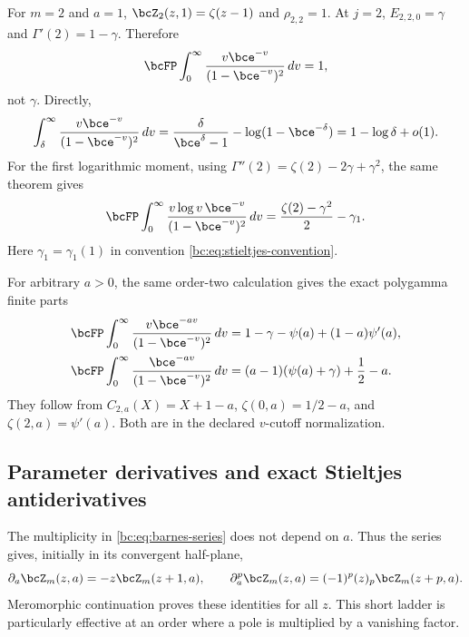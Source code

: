 \begin{example}
For $m=2$ and $a=1$,
$\bcZ_2(z,1)=\zeta(z-1)$ and $\rho_{2,2}=1$. At $j=2$,
$E_{2,2,0}=\gamma$ and $\Gamma'(2)=1-\gamma$. Therefore
\begin{equation}\label{bc:eq:Mellin-test-zero}
 \bcFP\int_0^\infty
           \frac{v\bce^{-v}}{(1-\bce^{-v})^2}\,dv=1,
\end{equation}
not $\gamma$. Directly,
\[
 \int_\delta^\infty\frac{v\bce^{-v}}{(1-\bce^{-v})^2}\,dv
  =\frac{\delta}{\bce^\delta-1}-\log(1-\bce^{-\delta})
  =1-\log\delta+o(1).
\]
For the first logarithmic moment, using
$\Gamma''(2)=\zeta(2)-2\gamma+\gamma^2$, the same theorem gives
\begin{equation}\label{bc:eq:Mellin-test-one}
 \bcFP\int_0^\infty
         \frac{v\log v\,\bce^{-v}}{(1-\bce^{-v})^2}\,dv
       =\frac{\zeta(2)-\gamma^2}{2}-\gamma_1.
\end{equation}
Here $\gamma_1=\gamma_1(1)$ in convention
\eqref{bc:eq:stieltjes-convention}.
\end{example}

For arbitrary $a>0$, the same order-two calculation gives the exact
polygamma finite parts
\begin{align}
 \bcFP\int_0^\infty\frac{v\bce^{-av}}{(1-\bce^{-v})^2}\,dv
   &=1-\gamma-\psi(a)+(1-a)\psi'(a),
       \label{bc:eq:fp-polygamma-two}\\
 \bcFP\int_0^\infty\frac{\bce^{-av}}{(1-\bce^{-v})^2}\,dv
   &=(a-1)(\psi(a)+\gamma)+\frac12-a.
       \label{bc:eq:fp-polygamma-one}
\end{align}
They follow from $C_{2,a}(X)=X+1-a$,
$\zeta(0,a)=1/2-a$, and $\zeta(2,a)=\psi'(a)$.
Both are in the declared $v$-cutoff normalization.

\subsection{Parameter derivatives and exact Stieltjes antiderivatives}

The multiplicity in \eqref{bc:eq:barnes-series} does not depend on $a$.
Thus the series gives, initially in its convergent half-plane,
\begin{equation}\label{bc:eq:a-ladder}
 \partial_a\bcZ_m(z,a)=-z\bcZ_m(z+1,a),\qquad
 \partial_a^p\bcZ_m(z,a)=(-1)^p(z)_p\bcZ_m(z+p,a).
\end{equation}
Meromorphic continuation proves these identities for all $z$. This
short ladder is particularly effective at an order where a pole is
multiplied by a vanishing factor.

